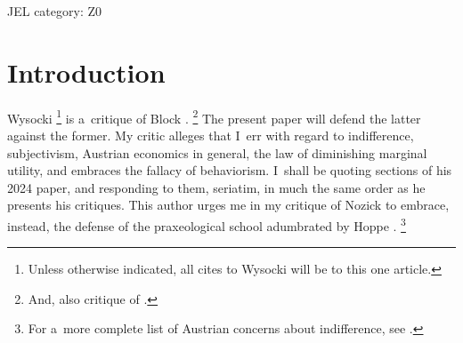 JEL category: Z0



\section{Introduction}

Wysocki 
\parencite*[][]{wysocki_rejoinder_2024}%
\footnote{Unless otherwise indicated, all cites to Wysocki will be to this one article.} is a~critique of Block 
\parencite*[][]{block_response_2022}.%
\footnote{And, also critique of 
\parencites[][]{barnett_modern_2003}[][and Block]{block_robert_1980}[][]{block_rejoinder_2009}[][]{block_rejoinder_2009-1}[][]{block_response_2012}[][]{block_rejoinder_2019}.%
} The present paper will defend the latter against the former. My critic alleges that I~err with regard to indifference, subjectivism, Austrian economics in general, the law of diminishing marginal utility, and embraces the fallacy of behaviorism. I~shall be quoting sections of his 2024 paper, and responding to them, seriatim, in much the same order as he presents his critiques. This author urges me in my critique of Nozick 
\parencite[][]{block_robert_1980} %
 to embrace, instead, the defense of the praxeological school adumbrated by Hoppe 
\parencites*[][]{hoppe_note_2005}[][]{hoppe_must_2005}[][]{hoppe_further_2009}.%
\footnote{For a~more complete list of Austrian concerns about indifference, see 
\parencites[][]{barnett_modern_2003}[][]{block_robert_1980}[][]{block_austrian_1999}[][]{block_realism_2003}[][]{block_reply_2007}[][]{block_rejoinder_2009}[][]{block_rejoinder_2009-1}[][]{block_response_2012}[][]{block_rejoinder_2019}[][]{block_rejoinder_2010}[][]{block_response_2012}[][]{}[][]{caplan_austrian_1999}[][]{caplan_probability_2001}[][]{caplan_probability_2003}[][]{caplan_trojan_2008}[][]{hoppe_must_2005}[][]{hoppe_note_2005}[][]{hoppe_further_2009}[][]{hulsmann_economic_1999}[][]{machaj_praxeological_2007}[][]{nozick_austrian_1977}[][]{oneill_choice_2010}[][]{sotelo_indifference_2014}[][]{wysocki_indifference_2016}[][]{wysocki_note_2017}[][]{wysocki_problem_2021}[][]{wysocki_rejoinder_2024}.%
}



